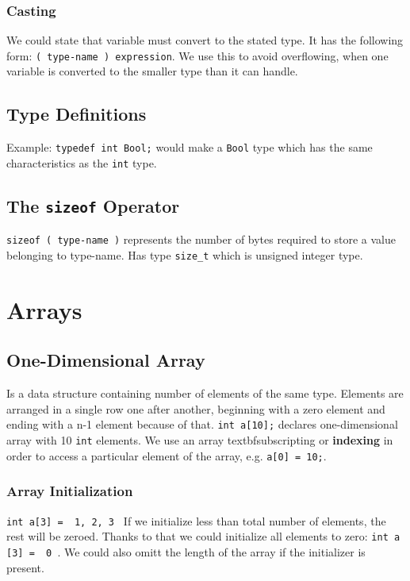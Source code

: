 \documentclass[openany]{book}
\begin{document}
    \subsection*{Casting}
    We could state that variable must convert to the stated type. It has the following
    form: \texttt{( type-name ) expression}. We use this to avoid overflowing, when
    one variable is converted to the smaller type than it can handle.

    \section{Type Definitions}
    Example: \texttt{typedef int Bool;} would make a \texttt{Bool} type which has
    the same characteristics as the \texttt{int} type.

    \section{The \texttt{sizeof} Operator}
    \texttt{sizeof ( type-name )} represents the number of bytes required to store
    a value belonging to type-name. Has type \texttt{size\_t} which is unsigned integer
    type.

    \chapter{Arrays}

    \section{One-Dimensional Array}
    Is a data structure containing number of elements of the same type. Elements
    are arranged in a single row one after another, beginning with a zero element
    and ending with a n-1 element because of that. \texttt{int a[10];} declares
    one-dimensional array with 10 \texttt{int} elements. We use an array 
    textbf{subscripting} or \textbf{indexing} in order to access a particular
    element of the array, e.g. \texttt{a[0] = 10;}.

    \subsection*{Array Initialization}
    \texttt{int a[3] = { 1, 2, 3 }} If we initialize less than total number of elements, the rest will be 
    zeroed. Thanks to that we could initialize all elements to zero: \texttt{int a [3] = { 0 }}. We could
    also omitt the length of the array if the initializer is present.
\end{document}

